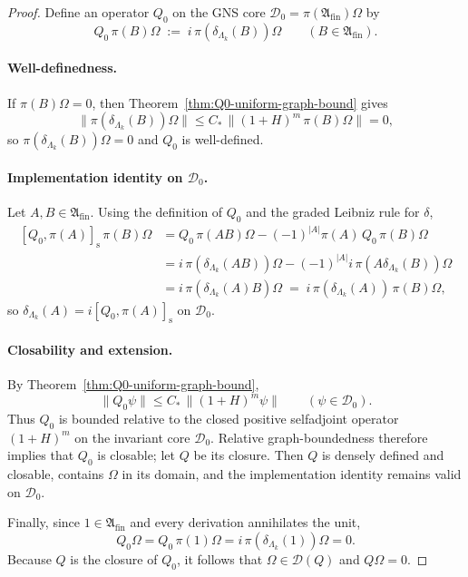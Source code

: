 \begin{proof}
Define an operator $Q_0$ on the GNS core $\mathcal D_0=\pi(\mathfrak A_{\mathrm{fin}})\Omega$
by
\[
Q_0\,\pi(B)\Omega \;:=\; i\,\pi(\delta_{\Lambda_k}(B))\Omega
\qquad(B\in\mathfrak A_{\mathrm{fin}}).
\]

\paragraph{Well-definedness.}
If $\pi(B)\Omega=0$, then Theorem~\ref{thm:Q0-uniform-graph-bound} gives
\[
\|\pi(\delta_{\Lambda_k}(B))\Omega\|
\le
C_*\,\|(1+H)^m\,\pi(B)\Omega\|
=0,
\]
so \(\pi(\delta_{\Lambda_k}(B))\Omega=0\) and $Q_0$ is well-defined.

\paragraph{Implementation identity on $\mathcal D_0$.}
Let $A,B\in\mathfrak A_{\mathrm{fin}}$.  Using the definition of $Q_0$ and the
graded Leibniz rule for $\delta$,
\[
\begin{aligned}
[Q_0,\pi(A)]_{\mathrm s}\,\pi(B)\Omega
&=Q_0\,\pi(AB)\Omega-(-1)^{|A|}\pi(A)\,Q_0\,\pi(B)\Omega \\
&=i\,\pi(\delta_{\Lambda_k}(AB))\Omega-(-1)^{|A|}i\,\pi(A\delta_{\Lambda_k}(B))\Omega \\
&=i\,\pi(\delta_{\Lambda_k}(A)B)\Omega
\;=\;i\,\pi(\delta_{\Lambda_k}(A))\,\pi(B)\Omega,
\end{aligned}
\]
so \(\delta_{\Lambda_k}(A)=i[Q_0,\pi(A)]_{\mathrm s}\) on \(\mathcal D_0\).

\paragraph{Closability and extension.}
By Theorem~\ref{thm:Q0-uniform-graph-bound},
\[
\|Q_0\psi\|
\le
C_*\,\|(1+H)^m\psi\|
\qquad(\psi\in\mathcal D_0).
\]
Thus \(Q_0\) is bounded relative to the closed positive selfadjoint operator
\((1+H)^m\) on the invariant core \(\mathcal D_0\). Relative graph-boundedness
therefore implies that \(Q_0\) is closable; let \(Q\) be its closure. Then \(Q\)
is densely defined and closable, contains \(\Omega\) in its domain, and the
implementation identity remains valid on \(\mathcal D_0\).

Finally, since \(1\in\mathfrak A_{\mathrm{fin}}\) and every derivation annihilates
the unit,
\[
Q_0\Omega
=
Q_0\,\pi(1)\Omega
=
i\,\pi(\delta_{\Lambda_k}(1))\Omega
=
0.
\]
Because \(Q\) is the closure of \(Q_0\), it follows that \(\Omega\in\mathcal D(Q)\)
and \(Q\Omega=0\).
\end{proof}

